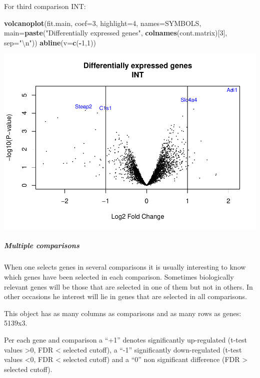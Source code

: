 \documentclass[]{article}
\newenvironment{Shaded}{\begin{snugshade}}{\end{snugshade}}
\newcommand{\KeywordTok}[1]{\textcolor[rgb]{0.13,0.29,0.53}{\textbf{#1}}}
\newcommand{\DataTypeTok}[1]{\textcolor[rgb]{0.13,0.29,0.53}{#1}}
\newcommand{\DecValTok}[1]{\textcolor[rgb]{0.00,0.00,0.81}{#1}}
\newcommand{\CharTok}[1]{\textcolor[rgb]{0.31,0.60,0.02}{#1}}
\newcommand{\StringTok}[1]{\textcolor[rgb]{0.31,0.60,0.02}{#1}}
\newcommand{\OperatorTok}[1]{\textcolor[rgb]{0.81,0.36,0.00}{\textbf{#1}}}
\newcommand{\NormalTok}[1]{#1}
\let\oldsubparagraph\subparagraph
\renewcommand{\subparagraph}[1]{\oldsubparagraph{#1}\mbox{}}
\begin{document}
For third comparison INT:

\begin{Shaded}
\begin{Highlighting}[]
\KeywordTok{volcanoplot}\NormalTok{(fit.main, }\DataTypeTok{coef=}\DecValTok{3}\NormalTok{, }\DataTypeTok{highlight=}\DecValTok{4}\NormalTok{, }\DataTypeTok{names=}\NormalTok{SYMBOLS, }
\DataTypeTok{main=}\KeywordTok{paste}\NormalTok{(}\StringTok{"Differentially expressed genes"}\NormalTok{, }\KeywordTok{colnames}\NormalTok{(cont.matrix)[}\DecValTok{3}\NormalTok{], }\DataTypeTok{sep=}\StringTok{"}\CharTok{\textbackslash{}n}\StringTok{"}\NormalTok{))}
\KeywordTok{abline}\NormalTok{(}\DataTypeTok{v=}\KeywordTok{c}\NormalTok{(}\OperatorTok{-}\DecValTok{1}\NormalTok{,}\DecValTok{1}\NormalTok{))}
\end{Highlighting}
\end{Shaded}

\includegraphics{delVal_AnaIsabel_ADO_PEC1_files/figure-latex/unnamed-chunk-47-1.pdf}

\subparagraph{Multiple comparisons}\label{multiple-comparisons}

When one selects genes in several comparisons it is usually interesting
to know which genes have been selected in each comparison. Sometimes
biologically relevant genes will be those that are selected in one of
them but not in others. In other occasions he interest will lie in genes
that are selected in all comparisons.

This object has as many columns as comparisons and as many rows as
genes: 5139x3.

Per each gene and comparison a ``+1'' denotes significantly up-regulated
(t-test values \textgreater{}0, FDR \textless{} selected cutoff), a
``-1'' significantly down-regulated (t-test values \textless{}0, FDR
\textless{} selected cutoff) and a ``0'' non significant difference (FDR
\textgreater{} selected cutoff).
\end{document}

